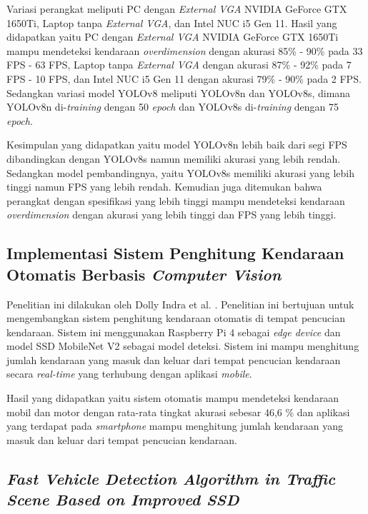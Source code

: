 Variasi perangkat meliputi PC dengan \emph{External VGA} NVIDIA GeForce GTX 1650Ti, Laptop tanpa \emph{External VGA}, dan Intel NUC i5 Gen 11. Hasil yang didapatkan yaitu PC dengan \emph{External VGA} NVIDIA GeForce GTX 1650Ti mampu mendeteksi kendaraan \emph{overdimension} dengan akurasi 85\% - 90\% pada 33 FPS - 63 FPS, Laptop tanpa \emph{External VGA} dengan akurasi 87\% - 92\% pada 7 FPS - 10 FPS, dan Intel NUC i5 Gen 11 dengan akurasi 79\% - 90\% pada 2 FPS. Sedangkan variasi model YOLOv8 meliputi YOLOv8n dan YOLOv8s, dimana YOLOv8n di-\emph{training} dengan 50 \emph{epoch} dan YOLOv8s di-\emph{training} dengan 75 \emph{epoch}.

Kesimpulan yang didapatkan yaitu model YOLOv8n lebih baik dari segi FPS dibandingkan dengan YOLOv8s namun memiliki akurasi yang lebih rendah. Sedangkan model pembandingnya, yaitu YOLOv8s memiliki akurasi yang lebih tinggi namun FPS yang lebih rendah. Kemudian juga ditemukan bahwa perangkat dengan spesifikasi yang lebih tinggi mampu mendeteksi kendaraan \emph{overdimension} dengan akurasi yang lebih tinggi dan FPS yang lebih tinggi.

\subsection{Implementasi Sistem Penghitung Kendaraan Otomatis Berbasis \emph{Computer Vision}}
\label{subsec:implementasisistemhitungkendaraan}
Penelitian ini dilakukan oleh Dolly Indra et al. \parencite*{dolly2023}. Penelitian ini bertujuan untuk mengembangkan sistem penghitung kendaraan otomatis di tempat pencucian kendaraan. Sistem ini menggunakan Raspberry Pi 4 sebagai \emph{edge device} dan model SSD MobileNet V2 sebagai model deteksi. Sistem ini mampu menghitung jumlah kendaraan yang masuk dan keluar dari tempat pencucian kendaraan secara \emph{real-time} yang terhubung dengan aplikasi \emph{mobile}.

Hasil yang didapatkan yaitu sistem otomatis mampu mendeteksi kendaraan mobil dan motor dengan rata-rata tingkat akurasi sebesar 46,6 \% dan aplikasi yang terdapat pada \emph{smartphone} mampu menghitung jumlah kendaraan yang masuk dan keluar dari tempat pencucian kendaraan.

\subsection{\emph{Fast Vehicle Detection Algorithm in Traffic Scene Based on Improved SSD}}
\label{subsec:fastvehicledetectionalgorithm}

